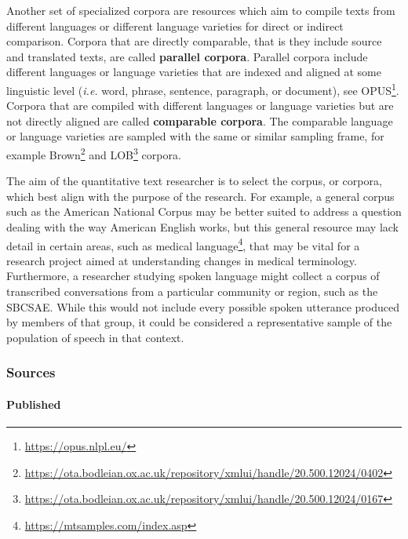 \documentclass[
  letterpaper,
  DIV=11,
  numbers=noendperiod]{scrreport}
\let\oldparagraph\paragraph
\renewcommand{\paragraph}[1]{\oldparagraph{#1}\mbox{}}
\theoremstyle{definition}
\theoremstyle{remark}
\DeclareRobustCommand{\href}[2]{#2\footnote{\url{#1}}}
\begin{document}
Another set of specialized corpora are resources which aim to compile
texts from different languages or different language varieties for
direct or indirect comparison. Corpora that are directly comparable,
that is they include source and translated texts, are called
\textbf{parallel corpora}. Parallel corpora include different languages
or language varieties that are indexed and aligned at some linguistic
level (\emph{i.e.} word, phrase, sentence, paragraph, or document), see
\href{https://opus.nlpl.eu/}{OPUS}. Corpora that are compiled with
different languages or language varieties but are not directly aligned
are called \textbf{comparable corpora}. The comparable language or
language varieties are sampled with the same or similar sampling frame,
for example
\href{https://ota.bodleian.ox.ac.uk/repository/xmlui/handle/20.500.12024/0402}{Brown}
and
\href{https://ota.bodleian.ox.ac.uk/repository/xmlui/handle/20.500.12024/0167}{LOB}
corpora.

The aim of the quantitative text researcher is to select the corpus, or
corpora, which best align with the purpose of the research. For example,
a general corpus such as the American National Corpus may be better
suited to address a question dealing with the way American English
works, but this general resource may lack detail in certain areas, such
as \href{https://mtsamples.com/index.asp}{medical language}, that may be
vital for a research project aimed at understanding changes in medical
terminology. Furthermore, a researcher studying spoken language might
collect a corpus of transcribed conversations from a particular
community or region, such as the SBCSAE. While this would not include
every possible spoken utterance produced by members of that group, it
could be considered a representative sample of the population of speech
in that context.

\hypertarget{sources}{%
\subsubsection{Sources}\label{sources}}

\hypertarget{published}{%
\paragraph{Published}\label{published}}
\end{document}
